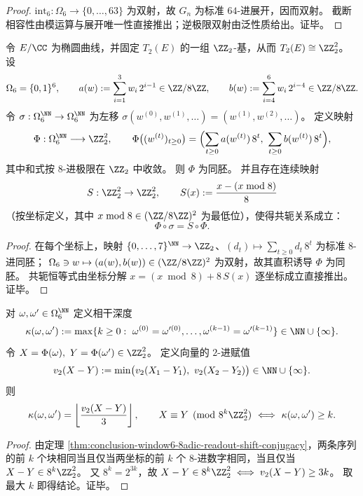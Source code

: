 \begin{proof}
\(\mathrm{int}_6:\Omega_6\to\{0,\dots,63\}\) 为双射，故 \(G_n\) 为标准 \(64\)-进展开，因而双射。
截断相容性由模运算与展开唯一性直接推出；逆极限双射由泛性质给出。证毕。
\end{proof}

\begin{theorem}\label{thm:conclusion-window6-8adic-readout-shift-conjugacy}
令 \(E/\CC\) 为椭圆曲线，并固定 \(T_2(E)\) 的一组 \(\ZZ_2\)-基，从而 \(T_2(E)\cong \ZZ_2^2\)。
设
\[
\Omega_6=\{0,1\}^6,
\qquad
a(w):=\sum_{i=1}^{3}w_i\,2^{i-1}\in \ZZ/8\ZZ,
\qquad
b(w):=\sum_{i=4}^{6}w_i\,2^{i-4}\in \ZZ/8\ZZ.
\]
令 \(\sigma:\Omega_6^{\NN}\to\Omega_6^{\NN}\) 为左移 \(\sigma(w^{(0)},w^{(1)},\dots)=(w^{(1)},w^{(2)},\dots)\)。
定义映射
\[
\Phi:\Omega_6^{\NN}\longrightarrow \ZZ_2^2,\qquad
\Phi\bigl((w^{(t)})_{t\ge 0}\bigr)
=\Bigl(\sum_{t\ge 0}a(w^{(t)})\,8^t,\ \sum_{t\ge 0}b(w^{(t)})\,8^t\Bigr),
\]
其中和式按 \(8\)-进极限在 \(\ZZ_2\) 中收敛。
则 \(\Phi\) 为同胚。
并且存在连续映射
\[
S:\ZZ_2^2\to \ZZ_2^2,\qquad
S(x):=\frac{x-(x\bmod 8)}{8}
\]
（按坐标定义，其中 \(x\bmod 8\in(\ZZ/8\ZZ)^2\) 为最低位），使得共轭关系成立：
\[
\Phi\circ\sigma=S\circ\Phi.
\]
\end{theorem}

\begin{proof}
在每个坐标上，映射 \(\{0,\dots,7\}^{\NN}\to\ZZ_2\)、\((d_t)\mapsto\sum_{t\ge 0}d_t\,8^t\) 为标准 \(8\)-进同胚；
\(\Omega_6\ni w\mapsto(a(w),b(w))\in(\ZZ/8\ZZ)^2\) 为双射，故其直积诱导 \(\Phi\) 为同胚。
共轭恒等式由坐标分解
\(
x=(x\bmod 8)+8\,S(x)
\)
逐坐标成立直接推出。证毕。
\end{proof}

\begin{corollary}\label{cor:conclusion-window6-coherence-depth-v2}
对 \(\omega,\omega'\in\Omega_6^{\NN}\) 定义相干深度
\[
\kappa(\omega,\omega'):=\max\{k\ge 0:\ \omega^{(0)}=\omega'^{(0)},\dots,\omega^{(k-1)}=\omega'^{(k-1)}\}\in\NN\cup\{\infty\}.
\]
令 \(X=\Phi(\omega),\ Y=\Phi(\omega')\in\ZZ_2^2\)。
定义向量的 \(2\)-进赋值
\[
v_2(X-Y):=\min\bigl(v_2(X_1-Y_1),\ v_2(X_2-Y_2)\bigr)\in\NN\cup\{\infty\}.
\]
则
\[
\kappa(\omega,\omega')=\left\lfloor\frac{v_2(X-Y)}{3}\right\rfloor,
\qquad
X\equiv Y\pmod{8^k\ZZ_2^2}\ \Longleftrightarrow\ \kappa(\omega,\omega')\ge k.
\]
\end{corollary}

\begin{proof}
由定理 \ref{thm:conclusion-window6-8adic-readout-shift-conjugacy}，两条序列的前 \(k\) 个块相同当且仅当两坐标的前 \(k\) 个 \(8\)-进数字相同，当且仅当 \(X-Y\in 8^k\ZZ_2^2\)。
又 \(8^k=2^{3k}\)，故 \(X-Y\in 8^k\ZZ_2^2\iff v_2(X-Y)\ge 3k\)。
取最大 \(k\) 即得结论。证毕。
\end{proof}

